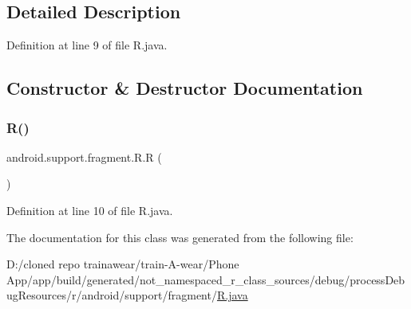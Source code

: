 \subsection{Detailed Description}


Definition at line 9 of file R.\+java.



\subsection{Constructor \& Destructor Documentation}
\mbox{\label{classandroid_1_1support_1_1fragment_1_1_r_ac2098583343558d9dd2ab4c9147159d9}} 
\subsubsection{\texorpdfstring{R()}{R()}}
{\footnotesize\ttfamily android.\+support.\+fragment.\+R.\+R (\begin{DoxyParamCaption}{ }\end{DoxyParamCaption})\hspace{0.3cm}{\ttfamily [private]}}



Definition at line 10 of file R.\+java.


\begin{DoxyCode}{0}

\end{DoxyCode}


The documentation for this class was generated from the following file\+:\begin{DoxyCompactItemize}
\item 
D\+:/cloned repo trainawear/train-\/\+A-\/wear/\+Phone App/app/build/generated/not\+\_\+namespaced\+\_\+r\+\_\+class\+\_\+sources/debug/process\+Debug\+Resources/r/android/support/fragment/\mbox{\hyperlink{process_debug_resources_2r_2android_2support_2fragment_2_r_8java}{R.\+java}}\end{DoxyCompactItemize}
